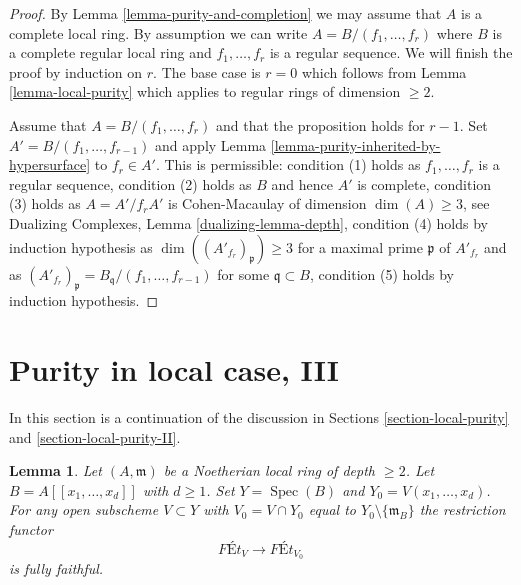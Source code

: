 \documentclass{stacks-project}
\theoremstyle{plain}
\newtheorem{lemma}[subsection]{Lemma}
\theoremstyle{definition}
\theoremstyle{remark}
\numberwithin{equation}{subsection}
\def\Spec{\mathop{\mathrm{Spec}}}
\begin{document}
\begin{proof}
By Lemma \ref{lemma-purity-and-completion} we may assume that $A$ is
a complete local ring. By assumption we can write
$A = B/(f_1, \ldots, f_r)$ where $B$ is a complete regular local
ring and $f_1, \ldots, f_r$ is a regular sequence.
We will finish the proof by induction on $r$.
The base case is $r = 0$ which follows from
Lemma \ref{lemma-local-purity} which applies to
regular rings of dimension $\geq 2$.

\medskip\noindent
Assume that $A = B/(f_1, \ldots, f_r)$ and that the proposition
holds for $r - 1$. Set $A' = B/(f_1, \ldots, f_{r - 1})$ and apply
Lemma \ref{lemma-purity-inherited-by-hypersurface} to $f_r \in A'$.
This is permissible:
condition (1) holds as $f_1, \ldots, f_r$ is a regular sequence,
condition (2) holds as $B$ and hence $A'$ is complete,
condition (3) holds as $A = A'/f_r A'$ is Cohen-Macaulay of dimension
$\dim(A) \geq 3$, see Dualizing Complexes, Lemma \ref{dualizing-lemma-depth},
condition (4) holds by induction hypothesis as
$\dim((A'_{f_r})_\mathfrak p) \geq 3$ for a maximal
prime $\mathfrak p$ of $A'_{f_r}$ and as
$(A'_{f_r})_\mathfrak p = B_\mathfrak q/(f_1, \ldots, f_{r - 1})$
for some $\mathfrak q \subset B$,
condition (5) holds by induction hypothesis.
\end{proof}




\section{Purity in local case, III}
\label{section-local-purity-III}

\noindent
In this section is a continuation of the discussion in
Sections \ref{section-local-purity} and \ref{section-local-purity-II}.

\begin{lemma}
\label{lemma-fully-faithful-power-series-over-depth2}
Let $(A, \mathfrak m)$ be a Noetherian local ring of depth $\geq 2$.
Let $B = A[[x_1, \ldots, x_d]]$ with $d \geq 1$.
Set $Y = \Spec(B)$ and $Y_0 = V(x_1, \ldots, x_d)$.
For any open subscheme $V \subset Y$ with
$V_0 = V \cap Y_0$ equal to $Y_0 \setminus \{\mathfrak m_B\}$
the restriction functor
$$
\textit{F\'Et}_V \longrightarrow \textit{F\'Et}_{V_0}
$$
is fully faithful.
\end{lemma}
\end{document}
